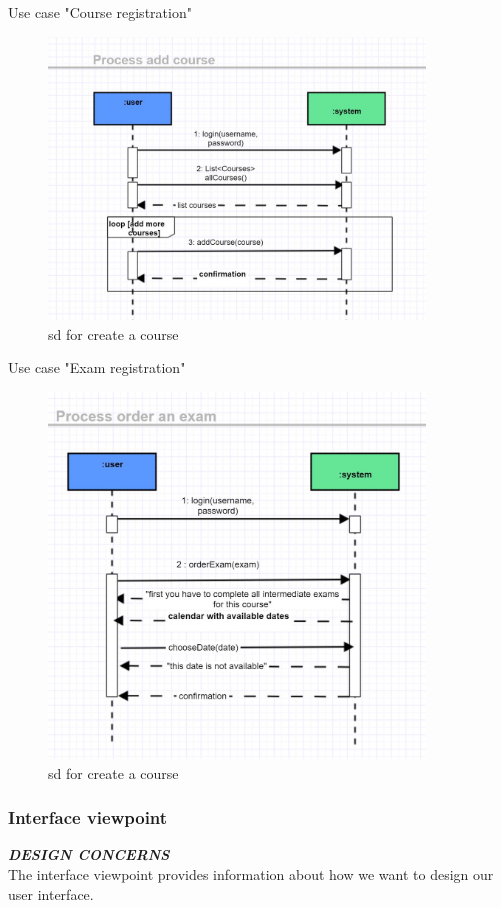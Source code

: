 \documentclass{scrartcl}
\begin{document}
Use case "Course registration"\\

\begin{figure}[H]
\centering
\includegraphics[width = 100mm]{sd/sd-addCourse}
\caption{sd for create a course }
\label{sd for course registration}
\end{figure}

Use case "Exam registration"\\
\begin{figure}[H]
\centering
\includegraphics[width = 100mm]{sd/sd-orderExam}
\caption{sd for create a course }
\label{sd for exam registration}
\end{figure}

\subsubsection{Interface viewpoint}
\textbf{\textit{DESIGN CONCERNS}}
\\
The interface viewpoint provides information about how we want to design our user interface. \\
\end{document}
